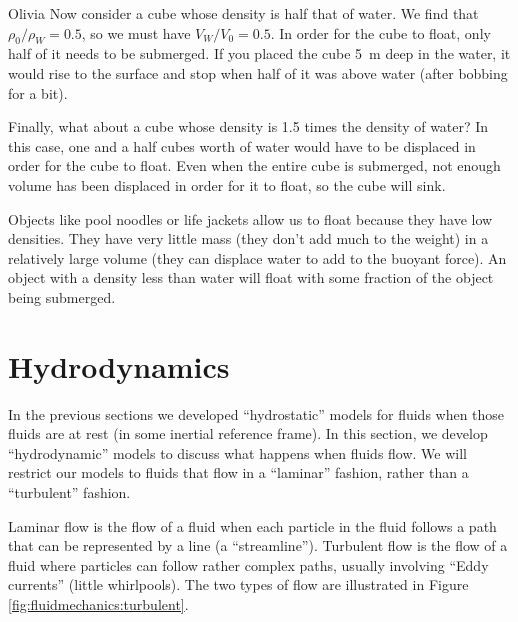 {{\begin{studentOpinion}{Olivia}
Now consider a cube whose density is half that of water. We find that $\rho_0/\rho_W=0.5$, so we must have $V_W/V_0=0.5$. In order for the cube to float, only half of it needs to be submerged. If you placed the cube \SI{5}{m} deep in the water, it would rise to the surface and stop when half of it was above water (after bobbing for a bit). 

Finally, what about a cube whose density is 1.5 times the density of water? In this case, one and a half cubes worth of water would have to be displaced in order for the cube to float. Even when the entire cube is submerged, not enough volume has been displaced in order for it to float, so the cube will sink. 

Objects like pool noodles or life jackets allow us to float because they have low densities. They have very little mass (they don't add much to the weight) in a relatively large volume (they can displace water to add to the buoyant force). An object with a density less than water will float with some fraction of the object being submerged.
\end{studentOpinion}


\section{Hydrodynamics}
In the previous sections we developed ``hydrostatic'' models for fluids when those fluids are at rest (in some inertial reference frame). In this section, we develop ``hydrodynamic'' models to discuss what happens when fluids flow. We will restrict our models to fluids that flow in a ``laminar'' fashion, rather than a ``turbulent'' fashion.

Laminar flow is the flow of a fluid when each particle in the fluid follows a path that can be represented by a line (a ``streamline''). Turbulent flow is the flow of a fluid where particles can follow rather complex paths, usually involving ``Eddy currents'' (little whirlpools). The two types of flow are illustrated in Figure \ref{fig:fluidmechanics:turbulent}.

}}
